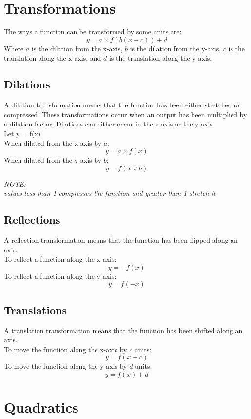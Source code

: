 \documentclass{book}
\newenvironment{note}{\begin{center}\em NOTE:\\}{\end{center}}
\begin{document}
\chapter{Transformations}
The ways a function can be transformed by some units are:
\[
	y = a \times f(b(x - c)) + d
\]
Where $a$ is the dilation from the x-axis, $b$ is the dilation from the y-axis, $c$ is the translation along the x-axis, and $d$ is the translation along the y-axis.

\section{Dilations}
A dilation transformation means that the function has been either stretched or compressed.  These transformations occur when an output has been multiplied by a dilation factor.  Dilations can either occur in the x-axis or the y-axis.\\
Let y = f(x)\\
When dilated from the x-axis by $a$:
\[
	y = a \times f(x)
\]
When dilated from the y-axis by $b$:
\[
	y = f(x \times b)
\]
\begin{note}
	values less than 1 compresses the function and greater than 1 stretch it
\end{note}

\section{Reflections}
A reflection transformation means that the function has been flipped along an axis.\\
To reflect a function along the x-axis:
\[
	y = -f(x)
\]
To reflect a function along the y-axis:
\[
	y = f(-x)
\]

\section{Translations}
A translation transformation means that the function has been shifted along an axis.\\
To move the function along the x-axis by $c$ units:
\[
	y = f(x - c)
\]
To move the function along the y-axis by $d$ units:
\[
	y = f(x) + d
\]

\chapter{Quadratics}
\end{document}
